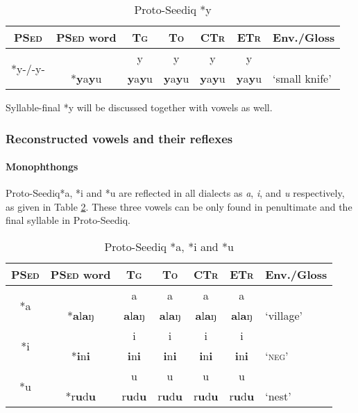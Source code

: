 \documentclass[12pt]{article}
\newcommand{\psed}{\textsc{PSed}\xspace}
\newcommand{\psedf}{Proto-Seediq\xspace}
\newcommand{\stg}{\textsc{Tg}\xspace}
\newcommand{\sto}{\textsc{To}\xspace}
\newcommand{\sctr}{\textsc{CTr}\xspace}
\newcommand{\setr}{\textsc{ETr}\xspace}
\begin{document}
\begin{table}[!htbp]
\centering
\caption{Proto-Seediq *y}
\label{tab:y}
\begin{tabular}{c|c|cccc|l}
\textbf{\psed} & \textbf{\psed word}      & \textbf{\stg} & \textbf{\sto} & \textbf{\sctr} & \textbf{\setr} & \multicolumn{1}{c}{\textbf{Env./Gloss}} \\ \hline
\multirow{2}{*}{*y-/-y-} & & y & y & y & y \\ \cline{2-7}
                         & *\textbf{y}a\textbf{y}u & \textbf{y}a\textbf{y}u & \textbf{y}a\textbf{y}u & \textbf{y}a\textbf{y}u & \textbf{y}a\textbf{y}u & `small knife' \\ \hline
\end{tabular}
\end{table}

Syllable-final *y will be discussed together with vowels as well.

\subsubsection{Reconstructed vowels and their reflexes}

\paragraph{Monophthongs}

\psedf *a, *i and *u are reflected in all dialects as \textit{a}, \textit{i}, and \textit{u} respectively, as given in Table \ref{tab:aiu}. These three vowels can be only found in penultimate and the final syllable in \psedf.  

\begin{table}[!htbp]
\centering
\caption{Proto-Seediq *a, *i and *u}
\label{tab:aiu}
\begin{tabular}{c|c|cccc|l}
\textbf{\psed} & \textbf{\psed word}      & \textbf{\stg} & \textbf{\sto} & \textbf{\sctr} & \textbf{\setr} & \multicolumn{1}{c}{\textbf{Env./Gloss}} \\ \hline
\multirow{2}{*}{*a} & & a & a & a & a &  \\ \cline{2-7}
                    & *\textbf{a}l\textbf{a}ŋ & \textbf{a}l\textbf{a}ŋ & \textbf{a}l\textbf{a}ŋ & \textbf{a}l\textbf{a}ŋ & \textbf{a}l\textbf{a}ŋ & `village' \\ \hline
\multirow{2}{*}{*i} & & i & i & i & i &  \\ \cline{2-7}
                    & *\textbf{i}n\textbf{i} & \textbf{i}n\textbf{i} & \textbf{i}n\textbf{i} & \textbf{i}n\textbf{i} & \textbf{i}n\textbf{i} & `\textsc{neg}' \\ \hline
\multirow{2}{*}{*u} & & u & u & u & u &  \\ \cline{2-7}
                    & *r\textbf{u}d\textbf{u} & r\textbf{u}d\textbf{u} & r\textbf{u}d\textbf{u} & r\textbf{u}d\textbf{u} & r\textbf{u}d\textbf{u} & `nest' \\ \hline
\end{tabular}
\end{table}
\end{document}
